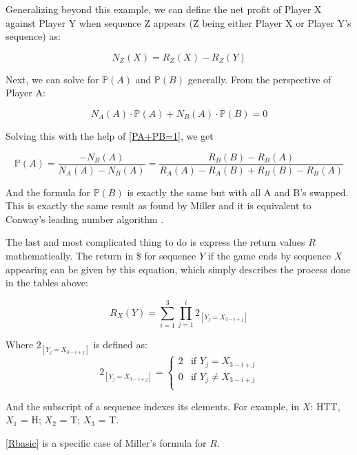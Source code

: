 \documentclass[english,12pt,a4paper,final]{article}
\begin{document}
Generalizing beyond this example, we can define the net profit of Player X against Player Y when sequence Z appears (Z being either Player X or Player Y's sequence) as:

\begin{equation}\label{NtwoPlayers}
	N_Z(X) = R_Z(X) - R_Z(Y)
\end{equation}

Next, we can solve for $\mathbb{P}(A)$ and $\mathbb{P}(B)$ generally. From the perspective of Player A:

\begin{equation}\label{profitEquation2P}
	N_A(A)\cdot\mathbb{P}(A) + N_B(A)\cdot\mathbb{P}(B) = 0
\end{equation}

Solving this with the help of \eqref{PA+PB=1}, we get

\begin{equation}\label{PtwoPlayersFirst}
	\mathbb{P}(A) = \frac{-N_B(A)}{N_A(A)-N_B(A)} = \frac{R_B(B)-R_B(A)}{R_A(A)-R_A(B)+R_B(B)-R_B(A)}
\end{equation}

And the formula for $\mathbb{P}(B)$ is exactly the same but with all A and B's swapped. This is exactly the same result as found by Miller and it is equivalent to Conway's leading number algorithm \parencite{miller}.

The last and most complicated thing to do is express the return values $R$ mathematically. The return in \$ for sequence $Y$ if the game ends by sequence $X$ appearing can be given by this equation, which simply describes the process done in the tables above:

\begin{equation}\label{Rbasic}
	R_X(Y) = \sum_{i=1}^{3} \prod_{j=1}^{i} 2_{[Y_j = X_{3-i+j}]}
\end{equation}

Where $2_{[Y_j = X_{3-i+j}]}$ is defined as:
\begin{equation*}
	2_{[Y_j = X_{3-i+j}]} = \begin{cases}
		2 & \text{if } Y_j = X_{3-i+j} \\
		0 & \text{if } Y_j \neq X_{3-i+j} \\
	\end{cases}
\end{equation*}

And the subscript of a sequence indexes its elements. For example, in $X$: HTT, $X_1$ = H; $X_2$ = T; $X_3$ = T.

\eqref{Rbasic} is a specific case of Miller's formula for $R$.
\end{document}
